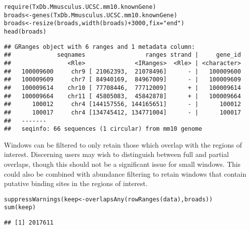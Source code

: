 \documentclass{report}\usepackage[]{graphicx}\usepackage[usenames,dvipsnames]{color}
\newcommand{\hlnum}[1]{\textcolor[rgb]{0.816,0.125,0.439}{#1}}%
\newcommand{\hlstr}[1]{\textcolor[rgb]{0.251,0.627,0.251}{#1}}%
\newcommand{\hlopt}[1]{\textcolor[rgb]{0,0,0}{#1}}%
\newcommand{\hlstd}[1]{\textcolor[rgb]{0.251,0.251,0.251}{#1}}%
\newcommand{\hlkwb}[1]{\textcolor[rgb]{0,0,0}{#1}}%
\newcommand{\hlkwc}[1]{\textcolor[rgb]{0.251,0.251,0.251}{#1}}%
\newcommand{\hlkwd}[1]{\textcolor[rgb]{0.878,0.439,0.125}{#1}}%
\newenvironment{knitrout}{}{} %
\begin{document}
\begin{knitrout}
\color{fgcolor}\begin{kframe}
\begin{alltt}
\hlkwd{require}\hlstd{(TxDb.Mmusculus.UCSC.mm10.knownGene)}
\hlstd{broads} \hlkwb{<-} \hlkwd{genes}\hlstd{(TxDb.Mmusculus.UCSC.mm10.knownGene)}
\hlstd{broads} \hlkwb{<-} \hlkwd{resize}\hlstd{(broads,} \hlkwd{width}\hlstd{(broads)}\hlopt{+}\hlnum{3000}\hlstd{,} \hlkwc{fix}\hlstd{=}\hlstr{"end"}\hlstd{)}
\hlkwd{head}\hlstd{(broads)}
\end{alltt}
\begin{verbatim}
## GRanges object with 6 ranges and 1 metadata column:
##             seqnames                 ranges strand |     gene_id
##                <Rle>              <IRanges>  <Rle> | <character>
##   100009600     chr9 [ 21062393,  21078496]      - |   100009600
##   100009609     chr7 [ 84940169,  84967009]      - |   100009609
##   100009614    chr10 [ 77708446,  77712009]      + |   100009614
##   100009664    chr11 [ 45805083,  45842878]      + |   100009664
##      100012     chr4 [144157556, 144165651]      - |      100012
##      100017     chr4 [134745412, 134771004]      - |      100017
##   -------
##   seqinfo: 66 sequences (1 circular) from mm10 genome
\end{verbatim}
\end{kframe}
\end{knitrout}
 
Windows can be filtered to only retain those which overlap with the regions of interest. 
Discerning users may wish to distinguish between full and partial overlaps, though this should not be a significant issue for small windows.
This could also be combined with abundance filtering to retain windows that contain putative binding sites in the regions of interest.

\begin{knitrout}
\color{fgcolor}\begin{kframe}
\begin{alltt}
\hlkwd{suppressWarnings}\hlstd{(keep} \hlkwb{<-} \hlkwd{overlapsAny}\hlstd{(}\hlkwd{rowRanges}\hlstd{(data), broads))}
\hlkwd{sum}\hlstd{(keep)}
\end{alltt}
\begin{verbatim}
## [1] 2017611
\end{verbatim}
\end{kframe}
\end{knitrout}
\end{document}
